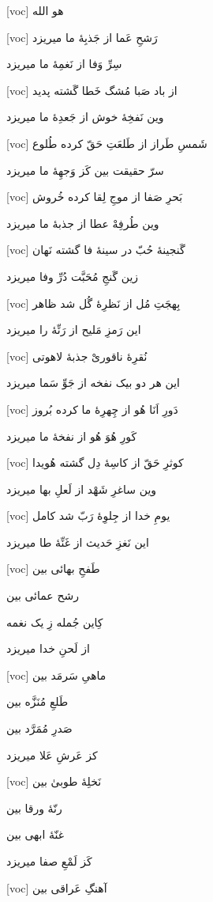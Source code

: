 \documentclass[11pt]{article}
\newenvironment{orig}
  {\begin{farsi}[voc]}
  {\end{farsi}}
\newenvironment{word}{}{}
\newcommand{\ayat}[1]{\vspace{4ex}\begin{orig}#1\end{orig}}
\begin{document}
\fontsize{24}{32}

\thispagestyle{empty}

\begin{word}
\ayat{
هو الله
}

\ayat{
رَشحِ عَما از جَذبِۀ ما میریزد

سِرِّ وَفا از نَغمِۀ ما میریزد
}

\ayat{
از باد صَبا مُشگ خَطا گَشته پدید

وین نَفخِۀ خوش از جَعدِۀ ما میریزد
}

\ayat{
شَمسِ طَراز از طَلعَتِ حَقّ کرده طُلوع

سرّ حقیقت بین کَز وَجهِۀ ما میریزد
}

\ayat{
بَحرِ صَفا از موجِ لِقا کرده خُروش

وین طُرفِهْ عطا از جذبۀ ما میریزد
}

\ayat{
گَنجینۀ حُبّ در سینۀ فا گشته نَهان

زین گَنجِ مُحَبَّت دُرِّ وفا ميريزد
}

\ayat{
بِهجَتِ مُل از نَظرِۀ گُل شد ظاهر

این رَمزِ مَلیح از رَنِّۀ را میریزد
}

\ayat{
نُقرِۀ ناقوریْ جذبۀ لاهوتی

این هر دو بیک نفخه از جَوِّ سَما میریزد
}

\ayat{
دَورِ اَنَا هُو از چِهرِۀ ما کرده بُروز

کَورِ هُوَ هُو از نفخۀ ما میریزد
}

\ayat{
کوثرِ حَقّ از کاسِۀ دِل گشته هُویدا

وین ساغرِ شَهْد از لَعلِ بها میریزد
}

\ayat{
یومِ خدا از جِلوِۀ رَبّ شد کامل

این نَغزِ حَدیث از غَنِّۀ طا میریزد
}

\ayat{
طَفحِ بهائی بین

رشح عمائی بین

کِاین جُمله زِ یک نغمه

از لَحنِ خدا میریزد
}

\ayat{
ماهیِ سَرمَد بین

طَلعِ مُنَزَّه بین

صَدرِ مُمَرَّد بین

کز عَرشِ عَلا میریزد
}

\ayat{
نَخلِۀ طوبیٰ بین

رنّۀ ورقا بین

غنّۀ ابهی بین

کَز لَمْعِ صفا میریزد
}

\ayat{
آهنگِ عَراقی بین

}
\end{word}
\end{document}
